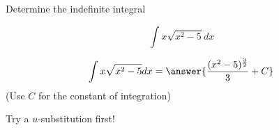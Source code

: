 \documentclass{ximera}
\author{Jason Miller}
\begin{document}
\begin{exercise}
Determine the indefinite integral 

\[
\int x\sqrt{x^{2}-5} dx
\]


\[
\int x \sqrt{x^{2}-5} dx= \answer{ \frac{ (x^{2}-5)^{\frac{3}{2}}}{3} +C }
\]
(Use $C$ for the constant of integration)

\begin{hint}
Try a $u$-substitution first!
\end{hint}
\end{exercise}
\end{document}
